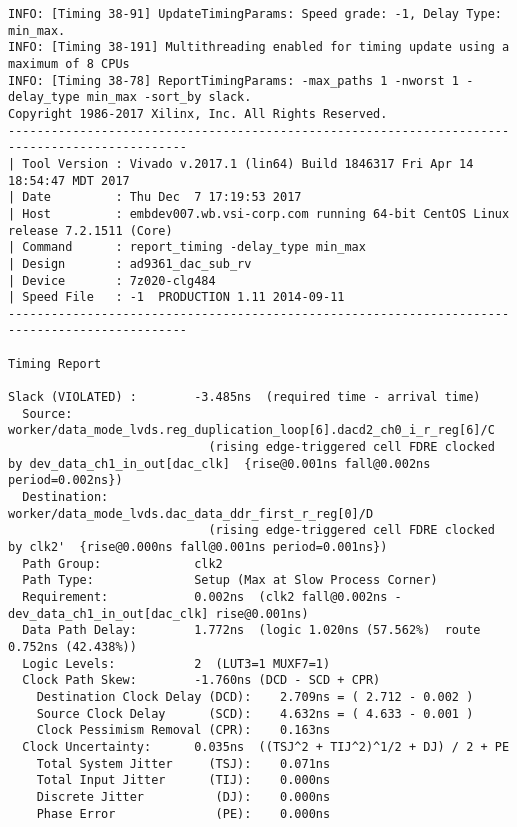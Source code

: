 \documentclass{article}
\begin{document}
\begin{lstlisting}
INFO: [Timing 38-91] UpdateTimingParams: Speed grade: -1, Delay Type: min_max.
INFO: [Timing 38-191] Multithreading enabled for timing update using a maximum of 8 CPUs
INFO: [Timing 38-78] ReportTimingParams: -max_paths 1 -nworst 1 -delay_type min_max -sort_by slack.
Copyright 1986-2017 Xilinx, Inc. All Rights Reserved.
-----------------------------------------------------------------------------------------------
| Tool Version : Vivado v.2017.1 (lin64) Build 1846317 Fri Apr 14 18:54:47 MDT 2017
| Date         : Thu Dec  7 17:19:53 2017
| Host         : embdev007.wb.vsi-corp.com running 64-bit CentOS Linux release 7.2.1511 (Core)
| Command      : report_timing -delay_type min_max
| Design       : ad9361_dac_sub_rv
| Device       : 7z020-clg484
| Speed File   : -1  PRODUCTION 1.11 2014-09-11
-----------------------------------------------------------------------------------------------

Timing Report

Slack (VIOLATED) :        -3.485ns  (required time - arrival time)
  Source:                 worker/data_mode_lvds.reg_duplication_loop[6].dacd2_ch0_i_r_reg[6]/C
                            (rising edge-triggered cell FDRE clocked by dev_data_ch1_in_out[dac_clk]  {rise@0.001ns fall@0.002ns period=0.002ns})
  Destination:            worker/data_mode_lvds.dac_data_ddr_first_r_reg[0]/D
                            (rising edge-triggered cell FDRE clocked by clk2'  {rise@0.000ns fall@0.001ns period=0.001ns})
  Path Group:             clk2
  Path Type:              Setup (Max at Slow Process Corner)
  Requirement:            0.002ns  (clk2 fall@0.002ns - dev_data_ch1_in_out[dac_clk] rise@0.001ns)
  Data Path Delay:        1.772ns  (logic 1.020ns (57.562%)  route 0.752ns (42.438%))
  Logic Levels:           2  (LUT3=1 MUXF7=1)
  Clock Path Skew:        -1.760ns (DCD - SCD + CPR)
    Destination Clock Delay (DCD):    2.709ns = ( 2.712 - 0.002 ) 
    Source Clock Delay      (SCD):    4.632ns = ( 4.633 - 0.001 ) 
    Clock Pessimism Removal (CPR):    0.163ns
  Clock Uncertainty:      0.035ns  ((TSJ^2 + TIJ^2)^1/2 + DJ) / 2 + PE
    Total System Jitter     (TSJ):    0.071ns
    Total Input Jitter      (TIJ):    0.000ns
    Discrete Jitter          (DJ):    0.000ns
    Phase Error              (PE):    0.000ns


\end{lstlisting}
\end{document}
